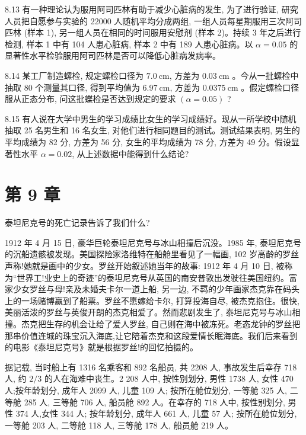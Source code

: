 \documentclass[10pt]{article}
\begin{document}
\begin{CJK*}{UTF8}{bsmi}
8.13 有一种理论认为服用阿司匹林有助于减少心脏病的发生, 为了进行验证, 研究人员把自愿参与实验的 22000 人随机平均分成两组, 一组人员每星期服用三次阿司匹林 (样本 1), 另一组人员在相同的时间服用安慰剂 (样本 2)。持续 3 年之后进行检测, 样本 1 中有 104 人患心脏病, 样本 2 中有 189 人患心脏病。以 $\alpha=0.05$ 的显著性水平检验服用阿司匹林是否可以降低心脏病发病率。

8.14 某工厂制造螺检, 规定螺检口径为 $7.0 \mathrm{~cm}$, 方差为 $0.03 \mathrm{~cm}$ 。今从一批螺检中抽取 80 个测量其口径, 得到平均值为 $6.97 \mathrm{~cm}$, 方差为 $0.0375 \mathrm{~cm}$ 。假定螺检口径服从正态分布, 问这批蝶检是否达到规定的要求 $(\alpha=0.05)$ ?

8.15 有人说在大学中男生的学习成绩比女生的学习成绩好。现从一所学校中随机抽取 25 名男生和 16 名女生, 对他们进行相同题目的测试。测试结果表明, 男生的平均成绩为 82 分, 方差为 56 分, 女生的平均成绩为 78 分, 方差为 49 分。假设显著性水平 $\alpha=0.02$, 从上述数据中能得到什么结论?

\section*{第 9 章}
\begin{center}
\end{center}

泰坦尼克号的死亡记录告诉了我们什么?

1912 年 4 月 15 日, 豪华巨轮泰坦尼克号与冰山相撞后沉没。1985 年, 泰坦尼克号的沉船遗骸被发现。美国探险家洛维特在船舱里看见了一幅画, 102 岁高龄的罗丝声称!她就是画中的少女。罗丝开始叙述她当年的故事: 1912 年 4 月 10 日, 被称为“世界工!业史上的奇迹”的泰坦尼克号从英国的南安普敦出发驶往美国纽约。富家少女罗丝与母!亲及未婚夫卡尔一道上船, 另一边, 不羁的少年画家杰克靠在码头上的一场赌博赢到了船票。罗丝不愿嫁给卡尔, 打算投海自尽, 被杰克抱住。很快, 美丽活泼的罗丝与英俊开朗的杰克相爱了。然而悲剧发生了, 泰坦尼克号与冰山相撞。杰克把生存的机会让给了爱人罗丝, 自己则在海中被冻死。老态龙钟的罗丝把那串价值连城的珠宝沉入海底,让它陪着杰克和这段爱情长眠海底。我们后来看到的电影《泰坦尼克号》就是根据罗丝!的回忆拍摄的。

据记载, 当时船上有 1316 名乘客和 892 名船员, 共 2208 人, 事故发生后幸存 718 人, 约 $2 / 3$ 的人在海难中丧生。2 208 人中, 按性别划分, 男性 1738 人, 女性 470 人;按年龄划分, 成年人 2099 人, 儿童 109 人; 按所在舱位划分, 一等舱 325 人, 二等舱 285 人, 三等舱 706 人, 船员舱 892 人。在幸存的 718 人中, 按性别划分, 男性 374 人,女性 344 人; 按年龄划分, 成年人 661 人, 儿童 57 人; 按所在舱位划分, 一等舱 203 人, 二等舱 118 人, 三等舱 178 人, 船员舱 219 人。


\end{CJK*}
\end{document}

